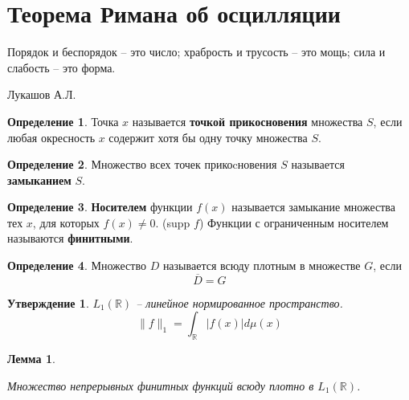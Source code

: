 \documentclass[a4paper,12pt]{article}
\theoremstyle{plain}
\newtheorem{lemma}{Лемма}[section]
\newtheorem{proposition}{Утверждение}[section]
\theoremstyle{definition}
\newtheorem{definition}{Определение}[section]
\theoremstyle{remark}
\begin{document}
\tableofcontents
\newpage

\section{Теорема Римана об осцилляции}

\epigraph{Порядок и беспорядок – это число; храбрость и трусость – это мощь; сила и слабость – это форма.}{Лукашов А.Л.}

\begin{definition}
	Точка $x$ называется \textbf{точкой прикосновения} множества $S$, если любая окресность $x$ содержит хотя бы одну точку множества $S$.
\end{definition}

\begin{definition}
	Множество всех точек прикоcновения $S$ называется \textbf{замыканием} $S$.
\end{definition}

\begin{definition}
	\textbf{Носителем} функции $f(x)$ называется замыкание множества тех $x$, для которых $f(x) \neq 0$. (supp $f$) Функции с ограниченным носителем называются \textbf{финитными}.
\end{definition}

\begin{definition}
	Множество $D$ называется всюду плотным в множестве $G$, если
	\[\overline{D} = G\]
\end{definition}

\begin{proposition}
	$L_1(\mathbb{R})$ -- линейное нормированное пространство.
	\[\|f\|_1 = \int_\mathbb{R} |f(x)| d\mu(x)\]
\end{proposition}

\begin{lemma}
	\label{C_IN_PLOTNI}

	Множество непрерывных финитных функций всюду плотно в $L_1(\mathbb{R})$.
\end{lemma}
\end{document}
